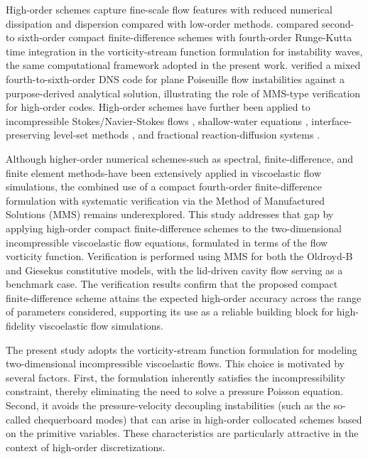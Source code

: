 \documentclass[preprint, 12pt]{elsarticle}
\begin{document}
High-order schemes capture fine-scale flow features with reduced numerical dissipation and dispersion compared with low-order methods. \citet{Souza2005} compared second- to sixth-order compact finite-difference schemes with fourth-order Runge-Kutta time integration in the vorticity-stream function formulation for instability waves, the same computational framework adopted in the present work. \citet{Silva2010} verified a mixed fourth-to-sixth-order DNS code for plane Poiseuille flow instabilities against a purpose-derived analytical solution, illustrating the role of MMS-type verification for high-order codes. High-order schemes have further been applied to incompressible Stokes/Navier-Stokes flows \citep{Fadel2011}, shallow-water equations \citep{Cueto2006}, interface-preserving level-set methods \citep{ZHANG2019634}, and fractional reaction-diffusion systems \citep{ALMUSHAIRA2021235, Allen1972, Gierer1972, Gray1984, Schnakenberg1979}.

Although higher-order numerical schemes-such as spectral, finite-di\-ffe\-ren\-ce, and finite element methods-have been extensively applied in viscoelastic flow simulations, the combined use of a compact fourth-order finite-difference formulation with systematic verification via the Method of Manufactured Solutions (MMS) remains underexplored. This study addresses that gap by applying high-order compact finite-difference schemes to the two-dimensional incompressible viscoelastic flow equations, formulated in terms of the flow vorticity function. Verification is performed using MMS for both the Oldroyd-B and Giesekus constitutive models, with the lid-driven cavity flow serving as a benchmark case. The verification results confirm that the proposed compact finite-difference scheme attains the expected high-order accuracy across the range of parameters considered, supporting its use as a reliable building block for high-fidelity viscoelastic flow simulations.

The present study adopts the vorticity-stream function formulation for modeling two-dimensional incompressible viscoelastic flows. This choice is motivated by several factors. First, the formulation inherently satisfies the incompressibility constraint, thereby eliminating the need to solve a pressure Poisson equation. Second, it avoids the pressure-velocity decoupling instabilities (such as the so-called chequerboard modes) that can arise in high-order collocated schemes based on the primitive variables. These characteristics are particularly attractive in the context of high-order discretizations.
\end{document}
